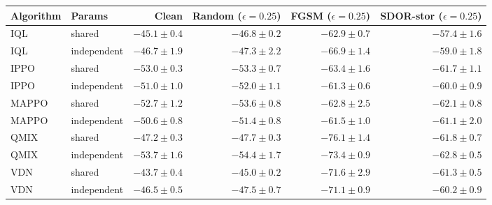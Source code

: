 \begin{tabular}{llrrrr}
\toprule
Algorithm & Params & Clean & Random ($\epsilon=0.25$) & FGSM ($\epsilon=0.25$) & SDOR-stor ($\epsilon=0.25$) \\
\midrule
IQL & shared & $-45.1\pm0.4$ & $-46.8\pm0.2$ & $-62.9\pm0.7$ & $-57.4\pm1.6$ \\
IQL & independent & $-46.7\pm1.9$ & $-47.3\pm2.2$ & $-66.9\pm1.4$ & $-59.0\pm1.8$ \\
\midrule
IPPO & shared & $-53.0\pm0.3$ & $-53.3\pm0.7$ & $-63.4\pm1.6$ & $-61.7\pm1.1$ \\
IPPO & independent & $-51.0\pm1.0$ & $-52.0\pm1.1$ & $-61.3\pm0.6$ & $-60.0\pm0.9$ \\
\midrule
MAPPO & shared & $-52.7\pm1.2$ & $-53.6\pm0.8$ & $-62.8\pm2.5$ & $-62.1\pm0.8$ \\
MAPPO & independent & $-50.6\pm0.8$ & $-51.4\pm0.8$ & $-61.5\pm1.0$ & $-61.1\pm2.0$ \\
\midrule
QMIX & shared & $-47.2\pm0.3$ & $-47.7\pm0.3$ & $-76.1\pm1.4$ & $-61.8\pm0.7$ \\
QMIX & independent & $-53.7\pm1.6$ & $-54.4\pm1.7$ & $-73.4\pm0.9$ & $-62.8\pm0.5$ \\
\midrule
VDN & shared & $-43.7\pm0.4$ & $-45.0\pm0.2$ & $-71.6\pm2.9$ & $-61.3\pm0.5$ \\
VDN & independent & $-46.5\pm0.5$ & $-47.5\pm0.7$ & $-71.1\pm0.9$ & $-60.2\pm0.9$ \\
\bottomrule
\end{tabular}